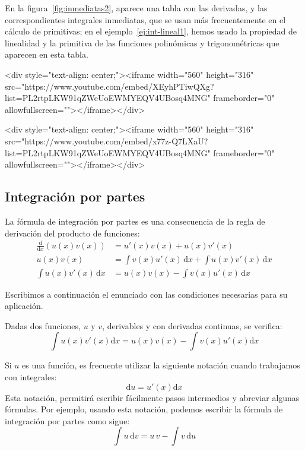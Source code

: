 En la figura~\ref{fig:inmediatas2}, aparece una tabla con las derivadas, y las correspondientes integrales inmediatas, que se usan más frecuentemente en el cálculo de primitivas;
en el ejemplo~\ref{ej:int-lineal1}, hemos usado la propiedad de linealidad y la primitiva de las funciones polinómicas y trigonométricas que aparecen en esta tabla.

\begin{rawhtml}
<div style="text-align: center;"><iframe width="560" height="316" src="https://www.youtube.com/embed/XEyhPTiwQXg?list=PL2rtpLKW91qZWeUoEWMYEQV4UBosq4MNG" frameborder="0" allowfullscreen=""></iframe></div>
\end{rawhtml}

\begin{rawhtml}
<div style="text-align: center;"><iframe width="560" height="316" src="https://www.youtube.com/embed/x77z-Q7LXaU?list=PL2rtpLKW91qZWeUoEWMYEQV4UBosq4MNG" frameborder="0" allowfullscreen=""></iframe></div>
\end{rawhtml}


\subsection{Integración por partes}\label{partes}

La fórmula de integración por partes es una consecuencia de la regla de derivación del producto de funciones:
\begin{align*}
\frac{\mathrm d}{\mathrm dx}(u(x)v(x)) &=
u'(x)v(x)+u(x)v'(x) \\
u(x)v(x) &=
\displaystyle\int v(x)u'(x)\,\mathrm dx + \displaystyle\int u(x)v'(x)\,\mathrm dx \\
\displaystyle\int u(x)v'(x)\,\mathrm dx &= u(x)v(x) - \displaystyle\int v(x)u'(x)\,\mathrm dx
\end{align*}

Escribimos a continuación el enunciado con las condiciones necesarias para su aplicación.
%
\begin{teorema}
Dadas dos funciones, $u$ y $v$, derivables y con derivadas continuas, se
verifica: 
$$
\displaystyle\int u(x)v'(x)\mathrm dx =u(x)v(x) -\displaystyle\int v(x)u'(x)\mathrm dx
$$
\end{teorema}
%
Si $u$ es una función, es frecuente utilizar la siguiente notación cuando trabajamos con integrales:
\[
\mathrm du = u'(x)\mathrm dx
\]
Esta notación, permitirá escribir fácilmente pasos intermedios y abreviar algunas fórmulas.
Por ejemplo, usando esta notación, podemos escribir la fórmula de integración por partes como sigue:
\[
\displaystyle\int u\,\mathrm dv =u\,v -\displaystyle\int v\,\mathrm du
\]

